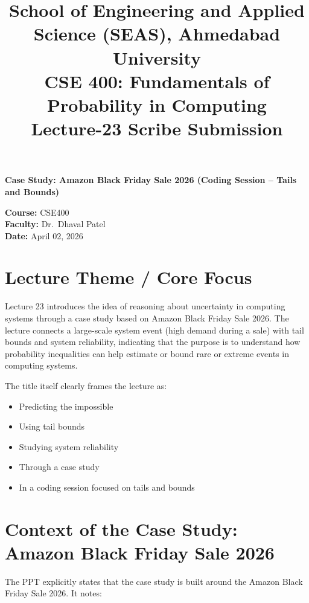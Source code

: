 \documentclass[11pt]{article}
\title{
    \normalsize School of Engineering and Applied Science (SEAS), Ahmedabad University \\
    \vspace{0.2cm}
    \textbf{CSE 400: Fundamentals of Probability in Computing}\\
    \Large Lecture-23 Scribe Submission
}
\author{}
\date{}
\begin{document}
\maketitle

\begin{center}
    {\large \textbf{Case Study: Amazon Black Friday Sale 2026 (Coding Session -- Tails and Bounds)}} \\[1.2em]
\end{center}

\noindent
\textbf{Course:} CSE400 \\
\textbf{Faculty:} Dr.\ Dhaval Patel \\
\textbf{Date:} April 02, 2026

\vspace{1em}

\section{Lecture Theme / Core Focus}

Lecture 23 introduces the idea of reasoning about uncertainty in computing systems through a case study based on Amazon Black Friday Sale 2026. The lecture connects a large-scale system event (high demand during a sale) with tail bounds and system reliability, indicating that the purpose is to understand how probability inequalities can help estimate or bound rare or extreme events in computing systems.

The title itself clearly frames the lecture as:

\begin{itemize}
    \item Predicting the impossible
    \item Using tail bounds
    \item Studying system reliability
    \item Through a case study
    \item In a coding session focused on tails and bounds
\end{itemize}

\section{Context of the Case Study: Amazon Black Friday Sale 2026}

The PPT explicitly states that the case study is built around the Amazon Black Friday Sale 2026. It notes:
\end{document}
